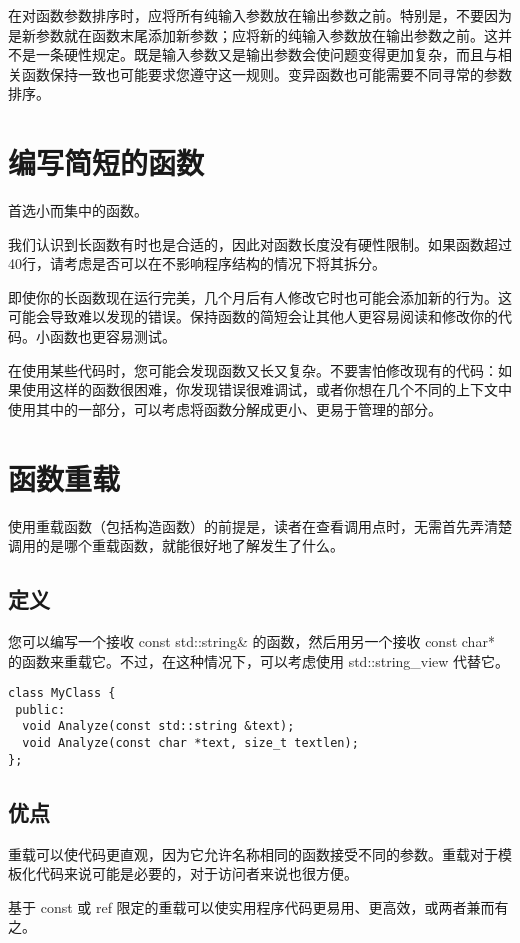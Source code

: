 在对函数参数排序时，应将所有纯输入参数放在输出参数之前。特别是，不要因为是新参数就在函数末尾添加新参数；应将新的纯输入参数放在输出参数之前。这并不是一条硬性规定。既是输入参数又是输出参数会使问题变得更加复杂，而且与相关函数保持一致也可能要求您遵守这一规则。变异函数也可能需要不同寻常的参数排序。


\section{编写简短的函数}
首选小而集中的函数。

我们认识到长函数有时也是合适的，因此对函数长度没有硬性限制。如果函数超过40行，请考虑是否可以在不影响程序结构的情况下将其拆分。

即使你的长函数现在运行完美，几个月后有人修改它时也可能会添加新的行为。这可能会导致难以发现的错误。保持函数的简短会让其他人更容易阅读和修改你的代码。小函数也更容易测试。

在使用某些代码时，您可能会发现函数又长又复杂。不要害怕修改现有的代码：如果使用这样的函数很困难，你发现错误很难调试，或者你想在几个不同的上下文中使用其中的一部分，可以考虑将函数分解成更小、更易于管理的部分。


\section{函数重载}
使用重载函数（包括构造函数）的前提是，读者在查看调用点时，无需首先弄清楚调用的是哪个重载函数，就能很好地了解发生了什么。


\subsection{定义}
您可以编写一个接收 const std::string\& 的函数，然后用另一个接收 const char* 的函数来重载它。不过，在这种情况下，可以考虑使用 std::string\_view 代替它。
\begin{verbatim}
class MyClass {
 public:
  void Analyze(const std::string &text);
  void Analyze(const char *text, size_t textlen);
};
\end{verbatim}


\subsection{优点}
重载可以使代码更直观，因为它允许名称相同的函数接受不同的参数。重载对于模板化代码来说可能是必要的，对于访问者来说也很方便。

基于 const 或 ref 限定的重载可以使实用程序代码更易用、更高效，或两者兼而有之。


